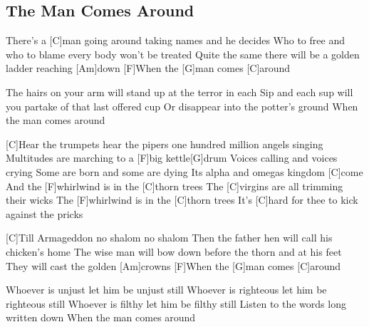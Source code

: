 \subsection*{The Man Comes Around   }



\begin{guitar}
There's a [C]man going around taking names and he decides
Who to free and who to blame every body won't be treated
Quite the same there will be a golden ladder reaching [Am]down
[F]When the [G]man comes [C]around

The hairs on your arm will stand up at the terror in each
Sip and each sup will you partake of that last offered cup
Or disappear into the potter's ground
When the man comes around


[C]Hear the trumpets hear the pipers one hundred million angels singing
Multitudes are marching to a [F]big kettle[G]drum
Voices calling and voices crying
Some are born and some are dying
Its alpha and omegas kingdom [C]come
And the [F]whirlwind is in the [C]thorn trees
The [C]virgins are all trimming their wicks
The [F]whirlwind is in the [C]thorn trees
It's [C]hard for thee to kick against the pricks

[C]Till Armageddon no shalom no shalom
Then the father hen will call his chicken's home
The wise man will bow down before the thorn and at his feet
They will cast the golden [Am]crowns
[F]When the [G]man comes [C]around

Whoever is unjust let him be unjust still
Whoever is righteous let him be righteous still
Whoever is filthy let him be filthy still
Listen to the words long written down
When the man comes around

\end{guitar}
